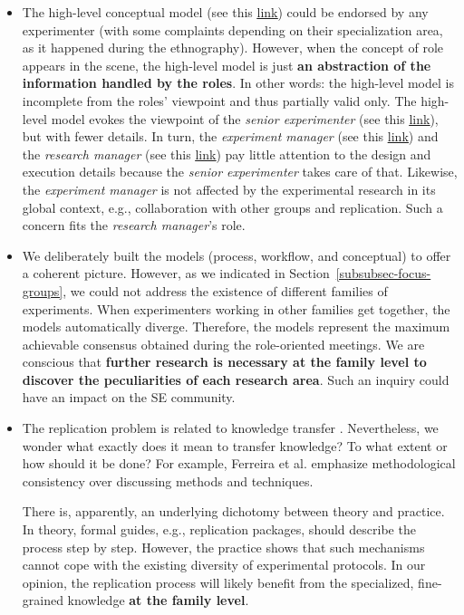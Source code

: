 \begin{itemize}
	\item The high-level conceptual model (see this \href{https://zenodo.org/record/7102405#.YyxvFOzMLUK}{\ul{link}}) could be endorsed by any experimenter (with some complaints depending on their specialization area, as it happened during the ethnography). However, when the concept of role appears in the scene, the high-level model is just \textbf{an abstraction of the information handled by the roles}. In other words: the high-level model is incomplete from the roles' viewpoint and thus partially valid only. The high-level model evokes the viewpoint of the \textit{senior experimenter} (see this \href{https://zenodo.org/record/7102464#.YyxvsezMLUK}{\ul{link}}), but with fewer details. In turn, the \textit{experiment manager} (see this \href{https://zenodo.org/record/7102450#.Yyxv6ezMLUL}{\ul{link}}) and the \textit{research manager} (see this \href{https://zenodo.org/record/7102431#.YyxwGezMLUL}{\ul{link}}) pay little attention to the design and execution details because the \textit{senior experimenter} takes care of that. Likewise, the \textit{experiment manager} is not affected by the experimental research in its global context, e.g., collaboration with other groups and replication. Such a concern fits the \textit{research manager}'s role. 
\item We deliberately built the models (process, workflow, and conceptual) to offer a coherent picture. However, as we indicated in Section~\ref{subsubsec-focus-groups}, we could not address the existence of different families of experiments. When experimenters working in other families get together, the models automatically diverge. Therefore, the models represent the maximum achievable consensus obtained during the role-oriented meetings. We are conscious that \textbf{further research is necessary at the family level to discover the peculiarities of each research area}. Such an inquiry could have an impact on the SE community. 
\item The replication problem is related to knowledge transfer \cite{Shull-2004-Knowledge-sharing-issues-SE}. Nevertheless, we wonder what exactly does it mean to transfer knowledge? To what extent or how should it be done? For example, Ferreira et al. \cite{Ferreira-2017-planning-experiments} emphasize methodological consistency over discussing methods and techniques. 

There is, apparently, an underlying dichotomy between theory and practice. In theory, formal guides, e.g., replication packages, should describe the process step by step. However, the practice shows that such mechanisms cannot cope with the existing diversity of experimental protocols. In our opinion, the replication process will likely benefit from the specialized, fine-grained knowledge \textbf{at the family level}.
\end{itemize}

